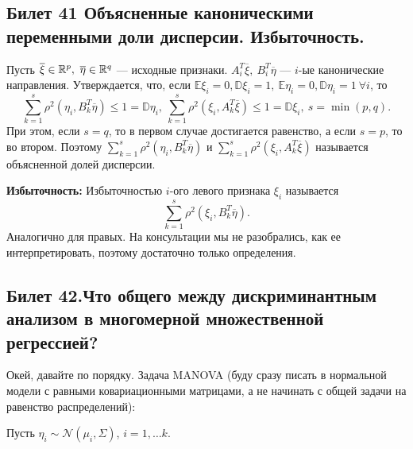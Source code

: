 \subsection{Билет 41 Объясненные	каноническими	переменными	доли	дисперсии.	Избыточность.}
Пусть $\overline{\xi} \in \R^p, \ \overline{\eta} \in \R^q$ --- исходные признаки.
$A_i^T \overline{\xi}, \ B_i^T \overline{\eta}$ --- $i$-ые канонические направления.
Утверждается, что, если $\mathbb{E}\xi_i = 0, \mathbb{D}\xi_i = 1, \ \mathbb{E}\eta_i = 0, \mathbb{D}\eta_i = 1 \ \forall i$, то
\begin{equation*}
\sum\limits_{k = 1}^{s} \rho^2(\eta_i, B_k^T \overline{\eta}) \le 1 = \mathbb{D}\eta_i, \ \sum\limits_{k = 1}^{s} \rho^2(\xi_i, A_k^T \overline{\xi}) \le 1 = \mathbb{D} \xi_i , \ s = \min(p, q).
\end{equation*}
При этом, если $s = q$, то в первом случае достигается равенство, а если $s = p$, то во втором.
Поэтому $\sum\limits_{k = 1}^{s} \rho^2(\eta_i, B_k^T \overline{\eta})$ и $\sum\limits_{k = 1}^{s} \rho^2(\xi_i, A_k^T \overline{\xi})$ называется объясненной долей дисперсии.

\textbf{Избыточность:}
Избыточностью $i$-ого левого признака $\xi_i$ называется
\begin{equation*}
\sum\limits_{k = 1}^{s} \rho^2(\xi_i, B_k^T \overline{\eta}).
\end{equation*}
Аналогично для правых. На консультации мы не разобрались, как ее интерпретировать, поэтому достаточно только определения.

\subsection{Билет 42.Что общего	между	дискриминантным	анализом в многомерной	множественной	регрессией?}
Окей, давайте по порядку.
Задача MANOVA (буду сразу писать в нормальной модели с равными ковариационными матрицами, а не начинать с общей задачи на равенство распределений):

Пусть $\eta_i \sim \mathcal{N}(\mu_i, \Sigma)$, $i = 1, \ldots k$.

